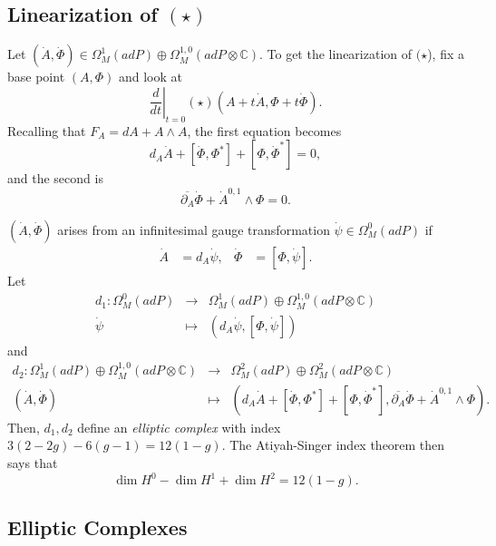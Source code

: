 \documentclass[oneside,english]{amsbook}
\numberwithin{section}{chapter}
\numberwithin{equation}{section}
\numberwithin{figure}{section}
\theoremstyle{plain}
\theoremstyle{definition}
\theoremstyle{remark}
\theoremstyle{definition}
\theoremstyle{definition}
\theoremstyle{plain}
\begin{document}
\subsection{Linearization of $(\star)$}

Let $\left(\dot{A},\dot{\Phi}\right)\in\Omega_{M}^{1}\left(adP\right)\oplus\Omega_{M}^{1,0}\left(adP\otimes\mathbb{C}\right)$.
To get the linearization of $(\star$), fix a base point $\left(A,\Phi\right)$
and look at 
\[
\left.\frac{d}{dt}\right|_{t=0}\left(\star\right)\left(A+t\dot{A},\Phi+t\dot{\Phi}\right).
\]
Recalling that $F_{A}=dA+A\wedge A$, the first equation becomes 
\[
d_{A}\dot{A}+\left[\dot{\Phi},\Phi^{*}\right]+\left[\Phi,\dot{\Phi}^{*}\right]=0,
\]
and the second is 
\[
\overline{\partial_{A}}\dot{\Phi}+\dot{A}^{0,1}\wedge\Phi=0.
\]


$\left(\dot{A},\dot{\Phi}\right)$ arises from an infinitesimal gauge
transformation $\dot{\psi}\in\Omega_{M}^{0}\left(adP\right)$ if 
\begin{align*}
\dot{A} & =d_{A}\dot{\psi}, & \dot{\Phi} & =\left[\Phi,\dot{\psi}\right].
\end{align*}
Let 
\begin{eqnarray*}
d_{1}:\Omega_{M}^{0}\left(adP\right) & \longrightarrow & \Omega_{M}^{1}\left(adP\right)\oplus\Omega_{M}^{1,0}\left(adP\otimes\mathbb{C}\right)\\
\dot{\psi} & \mapsto & \left(d_{A}\dot{\psi},\left[\Phi,\dot{\psi}\right]\right)
\end{eqnarray*}
and 
\begin{eqnarray*}
d_{2}:\Omega_{M}^{1}\left(adP\right)\oplus\Omega_{M}^{1,0}\left(adP\otimes\mathbb{C}\right) & \longrightarrow & \Omega_{M}^{2}\left(adP\right)\oplus\Omega_{M}^{2}\left(adP\otimes\mathbb{C}\right)\\
\left(\dot{A},\dot{\Phi}\right) & \mapsto & \left(d_{A}\dot{A}+\left[\dot{\Phi},\Phi^{*}\right]+\left[\Phi,\dot{\Phi}^{*}\right],\overline{\partial_{A}}\dot{\Phi}+\dot{A}^{0,1}\wedge\Phi\right).
\end{eqnarray*}
Then, $d_{1},d_{2}$ define an \emph{elliptic complex} with index
$3\left(2-2g\right)-6\left(g-1\right)=12\left(1-g\right)$. The Atiyah-Singer
index theorem then says that 
\[
\dim H^{0}-\dim H^{1}+\dim H^{2}=12\left(1-g\right).
\]



\subsection{Elliptic Complexes}
\end{document}
